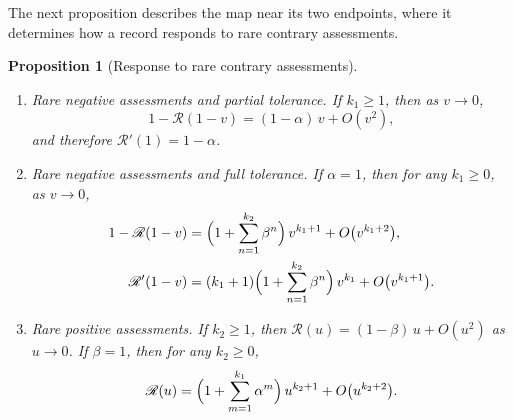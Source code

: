 \documentclass[10pt]{wlscirep}
\newcommand{\Rmap}{\mathscr{R}}            %
\theoremstyle{plain}
\newtheorem{proposition}[lemma]{Proposition}
\theoremstyle{remark}
\begin{document}
The next proposition describes the map near its two endpoints, where it determines how a record responds to rare contrary assessments.

\begin{proposition}[Response to rare contrary assessments]\label{prop:properties}
\begin{enumerate}
\item[(a)] \textit{Rare negative assessments and partial tolerance.} If $k_1\geq1$, then as $v\to0$,
\begin{equation}
1-\Rmap(1-v)=(1-\alpha)\,v+O(v^2),
\label{eq:s-goodlimit}
\end{equation}
and therefore $\Rmap'(1)=1-\alpha$.
\item[(b)] \textit{Rare negative assessments and full tolerance.} If $\alpha=1$, then for any $k_1\geq0$, as $v\to0$,
\begin{equation}
\begin{aligned}
1-\Rmap(1-v)&=\Bigl(1+\sum_{n=1}^{k_2}\beta^n\Bigr)\,v^{k_1+1}+O\bigl(v^{k_1+2}\bigr),\\
\Rmap'(1-v)&=(k_1+1)\Bigl(1+\sum_{n=1}^{k_2}\beta^n\Bigr)\,v^{k_1}+O\bigl(v^{k_1+1}\bigr).
\end{aligned}
\label{eq:s-goodlimit-full}
\end{equation}
\item[(c)] \textit{Rare positive assessments.} If $k_2\geq1$, then $\Rmap(u)=(1-\beta)\,u+O(u^2)$ as $u\to0$. If $\beta=1$, then for any $k_2\geq0$,
\begin{equation}
\Rmap(u)=\Bigl(1+\sum_{m=1}^{k_1}\alpha^m\Bigr)\,u^{k_2+1}+O\bigl(u^{k_2+2}\bigr).
\label{eq:s-badlimit}
\end{equation}
\end{enumerate}
\end{proposition}
\end{document}
